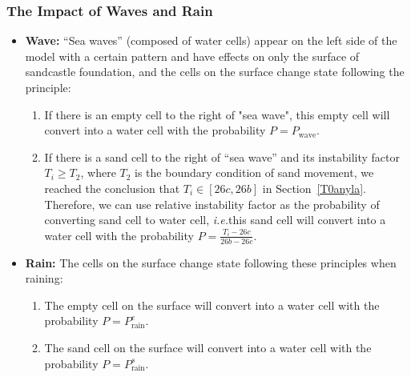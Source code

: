 \documentclass{mcmthesis}		    %
\def\ie{\mbox{\textit{i.e.}}}
\begin{document}
	\subsubsection{The Impact of Waves and Rain}\label{wave and rain}
   \begin{itemize}
   
	 \item \textbf{Wave:} ``Sea waves'' (composed of water cells) appear on the left side of the model with a certain pattern and have effects on only the surface of sandcastle foundation, and the cells on the surface change state following the principle:
     
     \begin{enumerate}
     
    
        \item  If there is an empty cell to the right of "sea wave", this empty cell will convert into a water cell with the probability $P=P_\text{wave}$.
     
         \item If there is a sand cell to the right of ``sea wave'' and its instability factor $T_i \geqslant T_2$, where $T_2$ is the boundary condition of sand movement, we reached the conclusion that $T_{i} \in[26 c, 26 b]$ in Section~\ref{T0anyla}. Therefore, we can use relative instability factor as the probability of converting sand cell to water cell,  \ie  this sand cell will convert into a water cell with the probability $P=\frac{T_i-26c}{26b-26c}$.
     
     \end{enumerate}
     
     \item \textbf{Rain:} The cells on the surface change state following these principles when raining:
	
	\begin{enumerate}
	    \item The empty cell on the surface will convert into a water cell with the probability $P=P_\text{rain}^e$.
    
	    \item The sand cell on the surface will convert into a water cell with the probability $P=P_\text{rain}^s$.
	\end{enumerate}
	
	\end{itemize}
\end{document}
